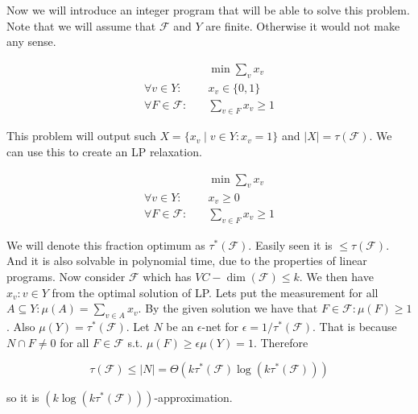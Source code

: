 Now we will introduce an integer program that will be able to solve this problem. Note that we will assume that $\mathcal{F}$ and $Y$ are finite. Otherwise it would not make any sense.

$$
\begin{aligned}
	&\min \sum_{v} x_{v} \\
	\forall v \in Y: \quad & x_{v} \in \{0,1\} \\
	\forall F \in \mathcal{F}: \quad & \sum_{v \in F} x_{v} \geq 1
\end{aligned}
$$

This problem will output such $X = \{x_{v} \mid v \in Y : x_{v} = 1\}$ and $|X| = \tau(\mathcal{F})$. We can use this to create an LP relaxation.

$$
\begin{aligned}
	&\min \sum_{v} x_{v} \\
	\forall v \in Y: \quad & x_{v} \geq 0 \\
	\forall F \in \mathcal{F}: \quad & \sum_{v \in F} x_{v} \geq 1
\end{aligned}
$$

We will denote this fraction optimum as $\tau^{\ast}(\mathcal{F})$. Easily seen it is $\leq \tau(\mathcal{F})$. And it is also solvable in polynomial time, due to the properties of linear programs. Now consider $\mathcal{F}$ which has $VC-\dim(\mathcal{F}) \leq k$. We then have $x_{v} : v \in Y$ from the optimal solution of LP. Lets put the measurement for all $A \subseteq Y: \mu(A) = \sum_{v \in A} x_{v}$. By the given solution we have that $F \in \mathcal{F}: \mu(F) \geq 1$. Also $\mu(Y) = \tau^{\ast}(\mathcal{F})$. Let $N$ be an $\epsilon$-net for $\epsilon = 1/\tau^{\ast}(\mathcal{F})$. That is because $N \cap F \neq 0$ for all $F \in \mathcal{F}$ s.t. $\mu(F) \geq \epsilon \mu(Y) = 1$. Therefore

$$
\tau(\mathcal{F}) \leq |N| = \Theta (k \tau^{\ast}(\mathcal{F}) \log(k \tau^{\ast}(\mathcal{F})))
$$

so it is $(k \log(k \tau^{\ast}(\mathcal{F})))$-approximation.